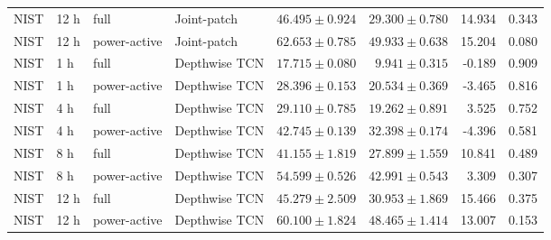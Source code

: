 \begin{longtable}{lll l rrrr}
NIST & 12 h & full & Joint-patch & $46.495\pm0.924$ & $29.300\pm0.780$ & 14.934 & 0.343\\
NIST & 12 h & power-active & Joint-patch & $62.653\pm0.785$ & $49.933\pm0.638$ & 15.204 & 0.080\\
NIST & 1 h & full & Depthwise TCN & $17.715\pm0.080$ & $9.941\pm0.315$ & -0.189 & 0.909\\
NIST & 1 h & power-active & Depthwise TCN & $28.396\pm0.153$ & $20.534\pm0.369$ & -3.465 & 0.816\\
NIST & 4 h & full & Depthwise TCN & $29.110\pm0.785$ & $19.262\pm0.891$ & 3.525 & 0.752\\
NIST & 4 h & power-active & Depthwise TCN & $42.745\pm0.139$ & $32.398\pm0.174$ & -4.396 & 0.581\\
NIST & 8 h & full & Depthwise TCN & $41.155\pm1.819$ & $27.899\pm1.559$ & 10.841 & 0.489\\
NIST & 8 h & power-active & Depthwise TCN & $54.599\pm0.526$ & $42.991\pm0.543$ & 3.309 & 0.307\\
NIST & 12 h & full & Depthwise TCN & $45.279\pm2.509$ & $30.953\pm1.869$ & 15.466 & 0.375\\
NIST & 12 h & power-active & Depthwise TCN & $60.100\pm1.824$ & $48.465\pm1.414$ & 13.007 & 0.153\\
\bottomrule\end{longtable}
